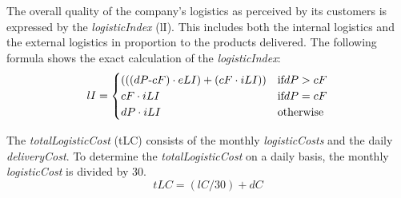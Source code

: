 The overall quality of the company's logistics as perceived by its customers is expressed by the \textit{logisticIndex} (\gls{lI}). This includes both the internal logistics and the external logistics in proportion to the products delivered. The following formula shows the exact calculation of the \textit{logisticIndex}:
\begin{equation}
\label{func:logisticIndex}
\begin{aligned}
lI = 
\begin{cases}
     ((( dP $-$ cF) \cdot eLI ) + ( cF \cdot iLI )) & \text{if} dP > cF \\
     cF \cdot iLI & \text{if} dP = cF\\
     dP \cdot iLI & \text{otherwise} \\
\end{cases}
\end{aligned}
\end{equation}

The \textit{totalLogisticCost} (\gls{tLC}) consists of the monthly \textit{logisticCosts} and the daily \textit{deliveryCost}. To determine the \textit{totalLogisticCost} on a daily basis, the monthly \textit{logisticCost} is divided by 30. 
\begin{equation}
    tLC = (lC/30) + dC
\end{equation}
